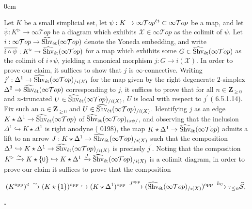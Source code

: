 \documentclass[10pt]{article}
\newcommand{\mS}{\mathcal S}
\newcommand{\cT}{\mathcal{T}}
\newcommand{\cX}{\mathcal{X}}
\newcommand{\ZZ}{\mathbb{Z}}
\def\ZZ{{\mathbf Z}}
\renewcommand{\qed}{\hfill$\square$}
\renewenvironment{proof}{\begin{addmargin}[1em]{0em}\begin{newproof}}{\end{newproof}\end{addmargin}\qed}
\theoremstyle{witharg}
\theoremstyle{witharg}
\theoremstyle{witharg2}
\begin{document}
\begin{proof}
Let $K$ be a small simplicial set, let $\psi:K\rightarrow \infty\cT op^{\textnormal{\'{e}t}}\subset \infty\cT op$ be a map, and let $\overline{\psi}:K^\triangleright\rightarrow \infty\cT op$ be a diagram which exhibits $\cX\in \infty\cT op$ as the colimit of $\psi$. Let $i:\infty\cT op\rightarrow \widehat{\textnormal{Shv}}_{\textnormal{\'{e}t}}(\infty\cT op)$ denote the Yoneda embedding, and write $\overline{i\circ \psi}:K^\triangleright\rightarrow \widehat{\textnormal{Shv}}_{\textnormal{\'{e}t}}(\infty\cT op)$ for a map which exhibits some $G\in \widehat{\textnormal{Shv}}_{\textnormal{\'{e}t}}(\infty\cT op)$ as the colimit of $i\circ \psi$, yielding a canonical morphism $j:G\rightarrow i(\cX)$. In order to prove our claim, it suffices to show that $j$ is $\infty$-connective. Writing $j^\prime:\Delta^1\rightarrow \widehat{\textnormal{Shv}}_{\textnormal{\'{e}t}}(\infty\cT op)_{/i(\cX)}$ for the map given by the right degenerate $2$-simplex $\Delta^2\rightarrow \widehat{\textnormal{Shv}}_{\textnormal{\'{e}t}}(\infty\cT op)$ corresponding to $j$, it suffices to prove that for all $n\in \ZZ_{\geq 0}$ and $n$-truncated $U\in \widehat{\textnormal{Shv}}_{\textnormal{\'{e}t}}(\infty\cT op)_{/i(X)}$, $U$ is local with respect to $j^\prime$ ( 6.5.1.14). Fix such an $n\in \ZZ_{\geq 0}$ and $U\in \widehat{\textnormal{Shv}}_{\textnormal{\'{e}t}}(\infty\cT op)_{/i(X)}$. Identifying $j$ as an edge $K\star \Delta^1\rightarrow \widehat{\textnormal{Shv}}_{\textnormal{\'{e}t}}(\infty\cT op)$ of $\widehat{\textnormal{Shv}}_{\textnormal{\'{e}t}}(\infty\cT op)_{i\circ \psi/}$, and observing that the inclusion $\Delta^1\hookrightarrow K\star \Delta^1$ is right anodyne ( 0198), the map $K\star \Delta^1\rightarrow \widehat{\textnormal{Shv}}_{\textnormal{\'{e}t}}(\infty\cT op)$ admits a lift to an arrow $J:K\star \Delta^1\rightarrow \widehat{\textnormal{Shv}}_{\textnormal{\'{e}t}}(\infty\cT op)_{/i(X)}$ such that the composition $\Delta^1\hookrightarrow K\star \Delta^1\rightarrow \widehat{\textnormal{Shv}}_{\textnormal{\'{e}t}}(\infty\cT op)_{/i(X)}$ is precisely $j^\prime$. Noting that the composition $K^\triangleright\xrightarrow{\sim}K\star \{0\}\hookrightarrow K\star \Delta^1\xrightarrow{J}\widehat{\textnormal{Shv}}_{\textnormal{\'{e}t}}(\infty\cT op)_{/i(X)}$ is a colimit diagram, in order to prove our claim it suffices to prove that the composition 

    $$(K^{\textnormal{opp}})^\triangleleft\xrightarrow{\sim}(K\star \{1\})^\textnormal{opp}\hookrightarrow (K\star \Delta^1)^\textnormal{opp}\xrightarrow{J^\textnormal{opp}}(\widehat{\textnormal{Shv}}_{\textnormal{\'{e}t}}(\infty\cT op)_{/i(X)})^\textnormal{opp}\xrightarrow{h_U}\tau_{\leq n}\widehat{\mS},$$


\end{proof}
\end{document}
